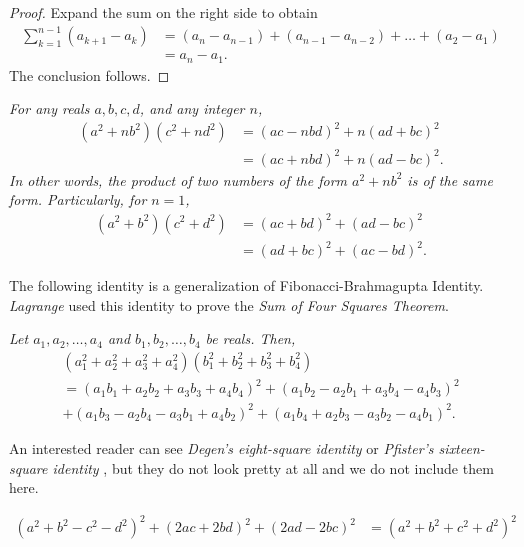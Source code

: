 	\begin{proof}
		Expand the sum on the right side to obtain
			\begin{align*}
				\sum_{k=1}^{n-1} \left(a_{k+1} - a_{k}\right)
					&=  \left(a_{n} - a_{n-1}\right) +  \left(a_{n-1} - a_{n-2}\right) + \dots +  \left(a_{2} - a_{1}\right)\\
					&= a_n - a_1.	
			\end{align*}
		The conclusion follows.
	\end{proof}
	

	\begin{identity}\slshape\label{id:fibbr}
		For any reals $a,b,c,d$, and any integer $n$,
		\begin{align*}
			(a^2+nb^2)(c^2+nd^2)&=(ac-nbd)^2+n(ad+bc)^2\\
			&=(ac+nbd)^2+n(ad-bc)^2.
		\end{align*}
		In other words, the product of two numbers of the form $a^2+nb^2$ is of the same form. Particularly, for $n=1$,
		\begin{align*}
			(a^2+b^2)(c^2+d^2)&=(ac+bd)^2+(ad-bc)^2\\
			&=(ad+bc)^2+(ac-bd)^2.
		\end{align*}
	\end{identity}
	
	The following identity is a generalization of Fibonacci-Brahmagupta Identity. \textit{Lagrange} used this identity to prove the \textit{Sum of Four Squares Theorem}.
	
	\begin{identity}\slshape\label{id:foursqr}
		Let $a_1,a_2,\ldots,a_4$ and $b_1,b_2,\ldots,b_4$ be reals. Then,
		\begin{multline*}
			(a_1^2+a_2^2+a_3^2+a_4^2)(b_1^2+b_2^2+b_3^2+b_4^2) \\=(a_1 b_1 + a_2 b_2 + a_3 b_3 + a_4 b_4)^2 +(a_1 b_2 - a_2 b_1 + a_3 b_4 - a_4 b_3)^2\\
			+(a_1 b_3 - a_2 b_4 - a_3 b_1 + a_4 b_2)^2 +(a_1 b_4 + a_2 b_3 - a_3 b_2 - a_4 b_1)^2.
		\end{multline*}
	\end{identity}
	An interested reader can see \textit{Degen's eight-square identity} \cite{ch:idthm-piezas} or \textit{Pfister's sixteen-square identity} \cite{ch:idthm-conrad}, but they do not look pretty at all and we do not include them here.
	
	\begin{identity}\slshape\label{id:lebesgue}
		\begin{align*}
			(a^2+b^2-c^2-d^2)^2 + (2ac+2bd)^2 + (2ad-2bc)^2 & = (a^2+b^2+c^2+d^2)^2
		\end{align*}
	\end{identity}
	
